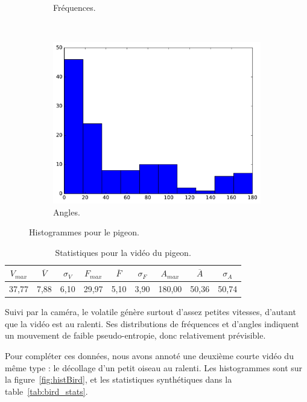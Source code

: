 \begin{figure}[!htbp]
\begin{subfigure}[t]{\subImgWclicks}
			\caption{Fréquences.}
			\label{fig:oiseau_frequency}
		\end{subfigure}
		~
		\begin{subfigure}[t]{\subImgWclicks}
			\centering
			\includegraphics[width=\textwidth]{figures/ch3/oiseau_angle}
			\caption{Angles.}
			\label{fig:oiseau_angle}
		\end{subfigure}
		\caption[Histogrammes pour le pigeon]{Histogrammes pour le pigeon.}
		\label{fig:histOiseau}
	\end{figure}
	
\begin{table}
	\centering
	\begin{tabular}{c c c c c c c c c}
		$V_{max}$	& $\overline{V}$	& $\sigma_{V}$	& $F_{max}$	& $\overline{F}$	& $\sigma_{F}$	& $A_{max}$	& $\overline{A}$	& $\sigma_{A}$	\bigstrut[b] \\ \hline

		37,77		& 7,88				& 6,10			& 29,97		& 5,10				& 3,90			& 180,00	& 50,36				& 50,74			\bigstrut[t] \\
	\end{tabular}
	\caption[Statistiques pour la vidéo du pigeon]{Statistiques pour la vidéo du pigeon.}
	\label{tab:oiseau_stats}
\end{table}

	Suivi par la caméra, le volatile génère surtout d'assez petites vitesses, d'autant que la vidéo est au ralenti. Ses distributions de fréquences et d'angles indiquent un mouvement de faible pseudo-entropie, donc relativement prévisible.
	
	Pour compléter ces données, nous avons annoté une deuxième courte vidéo du même type : le décollage d'un petit oiseau au ralenti. Les histogrammes sont sur la figure~\ref{fig:histBird}, et les statistiques synthétiques dans la table~\ref{tab:bird_stats}.
	
